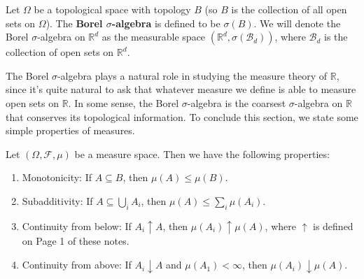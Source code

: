 \begin{definition}
	Let $\Omega$ be a topological space with topology $B$ (so $B$ is the collection of all open sets on $\Omega$). The \textbf{Borel $\sigma$-algebra} is defined to be $\sigma(B)$. We will denote the Borel $\sigma$-algebra on $\mathbb R^d$ as the measurable space $(\mathbb R^d, \sigma(\mathcal B_d))$, where $\mathcal B_d$ is the collection of open sets on $\mathbb R^d$. 
\end{definition}
The Borel $\sigma$-algebra plays a natural role in studying the measure theory of $\mathbb R$, since it's quite natural to ask that whatever measure we define is able to measure open sets on $\mathbb R$. In some sense, the Borel $\sigma$-algebra is the coarsest $\sigma$-algebra on $\mathbb R$ that conserves its topological information. To conclude this section, we state some simple properties of measures.
\begin{prop}
	Let $(\Omega, \mathcal F, \mu)$ be a measure space. Then we have the following properties:
	\begin{enumerate}
		\item Monotonicity: If $A\subseteq B$, then $\mu(A)\leq \mu(B)$. 
		\item Subadditivity: If $A\subseteq\bigcup_i A_i$, then $\mu(A)\leq \sum_i \mu(A_i)$. 
		\item Continuity from below: If $A_i\uparrow A$, then $\mu(A_i)\uparrow\mu(A)$, where $\uparrow$ is defined on Page 1 of these notes. 
		\item Continuity from above: If $A_i\downarrow A$ and $\mu(A_1) < \infty$, then $\mu(A_i)\downarrow \mu(A)$. 
	\end{enumerate}
\end{prop}
